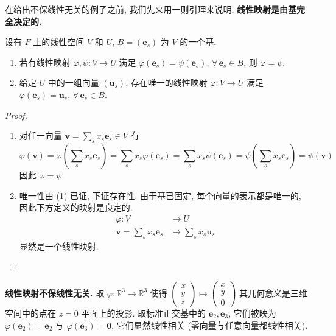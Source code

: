 \documentclass[UTF8]{book}
\begin{document}
在给出不保线性无关的例子之前, 我们先来用一则引理来说明, 
\textbf{线性映射是由基完全决定的.} 

\begin{lemma}\label{lemma linear mapping}
    设有 $F$ 上的线性空间 $V$ 和 $U$, $B=(\boldsymbol{e}_s)$ 为 $V$ 
    的一个基. 
    \begin{enumerate}[(1)]
        \item 若有线性映射 $\varphi,\psi : V \to U$ 
        满足 $\varphi(\boldsymbol{e}_s) = \psi(\boldsymbol{e}_s), 
        \,\forall\,\boldsymbol{e}_s \in B $, 
        则 $\varphi = \psi$. 
        
        \item 给定 $U$ 中的一组向量 
        $(\boldsymbol{u}_s)$, 存在唯一的线性映射 $\varphi: V\to U$ 
        满足 $\varphi(\boldsymbol{e}_s) = \boldsymbol{u}_s,\,
        \forall\,\boldsymbol{e}_s \in B$. 
    \end{enumerate}
\end{lemma}

\begin{proof}
    \begin{enumerate}[(1)]
        \item 对任一向量 
        $\boldsymbol{v} = \sum_{s} x_s\boldsymbol{e}_s \in V$ 
        有 
        $$\varphi(\boldsymbol{v})=
        \varphi\left(\sum_{s} x_s\boldsymbol{e}_s\right)
        = \sum_{s} x_s\varphi(\boldsymbol{e}_s)=
        \sum_{s} x_s\psi(\boldsymbol{e}_s) 
        = \psi \left(\sum_{s} x_s\boldsymbol{e}_s\right) 
        = \psi(\boldsymbol{v})$$
        因此 $\varphi = \psi$. 
        
        \item 唯一性由 (1) 已证, 下证存在性. 
        由于基已固定, 每个向量的表示都是唯一的, 
        因此下方定义的映射是良定的. 
        $$\begin{aligned}
            \varphi : V &\to U \\
            \boldsymbol{v} = \sum_{s}x_s\boldsymbol{e}_s 
            &\mapsto \sum_{s}x_s\boldsymbol{u}_s
        \end{aligned}$$
        显然是一个线性映射. 
    \end{enumerate}
\end{proof}

\begin{example}
    \textbf{线性映射不保线性无关.} 
    取 $\varphi : \mathbb{R}^3 \to \mathbb{R}^3$ 
    使得 
    $\begin{pmatrix}
        x \\ y \\ z 
    \end{pmatrix}
    \mapsto 
    \begin{pmatrix}
        x \\ y \\ 0
    \end{pmatrix}$
    其几何意义是三维空间中的点在 $z=0$ 平面上的投影. 
    取标准正交基中的 $\boldsymbol{e}_2,\boldsymbol{e}_3$, 
    它们被映为 $\varphi(\boldsymbol{e}_2) = \boldsymbol{e}_2$ 
    与 $\varphi(\boldsymbol{e}_3) = \boldsymbol{0}$, 
    它们显然线性相关 (零向量与任意向量都线性相关). 
\end{example}
\end{document}
